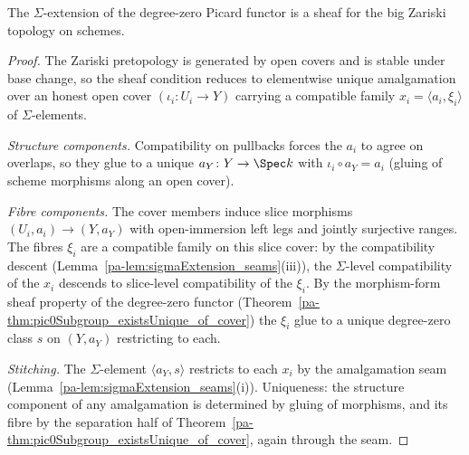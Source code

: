 \begin{theorem}
  \label{pa-thm:pic0SigmaFunctor_isSheaf}
  \leanok

  The \(\Sigma\)-extension of the degree-zero Picard functor is a sheaf for the big Zariski
  topology on schemes.
\end{theorem}
\begin{proof}
  \leanok
  The Zariski pretopology is generated by open covers and is stable under base change, so
  the sheaf condition reduces to elementwise unique amalgamation over an honest open cover
  \((\iota_i \colon U_i \to Y)\) carrying a compatible family
  \(x_i = \langle a_i, \xi_i \rangle\) of \(\Sigma\)-elements.

  \emph{Structure components.} Compatibility on pullbacks forces the \(a_i\) to agree on
  overlaps, so they glue to a unique \(a_Y \colon Y \to \Spec k\) with
  \(\iota_i \circ a_Y = a_i\) (gluing of scheme morphisms along an open cover).

  \emph{Fibre components.} The cover members induce slice morphisms
  \((U_i, a_i) \to (Y, a_Y)\) with open-immersion left legs and jointly surjective ranges.
  The fibres \(\xi_i\) are a compatible family on this slice cover: by the compatibility
  descent (Lemma~\ref{pa-lem:sigmaExtension_seams}(iii)), the \(\Sigma\)-level compatibility of
  the \(x_i\) descends to slice-level compatibility of the \(\xi_i\). By the morphism-form
  sheaf property of the degree-zero functor
  (Theorem~\ref{pa-thm:pic0Subgroup_existsUnique_of_cover}) the \(\xi_i\) glue to a unique
  degree-zero class \(s\) on \((Y, a_Y)\) restricting to each.

  \emph{Stitching.} The \(\Sigma\)-element \(\langle a_Y, s\rangle\) restricts to each
  \(x_i\) by the amalgamation seam (Lemma~\ref{pa-lem:sigmaExtension_seams}(i)). Uniqueness:
  the structure component of any amalgamation is determined by gluing of morphisms, and its
  fibre by the separation half of
  Theorem~\ref{pa-thm:pic0Subgroup_existsUnique_of_cover}, again through the seam.
\end{proof}

